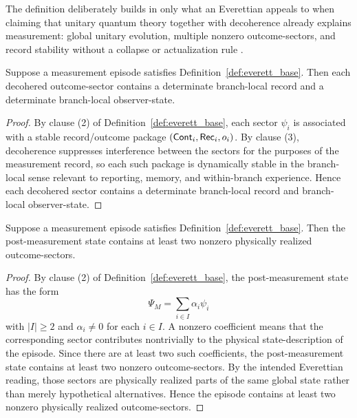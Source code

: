 The definition deliberately builds in only what an Everettian appeals to when claiming that unitary
quantum theory together with decoherence already explains measurement: global unitary evolution,
multiple nonzero outcome-sectors, and record stability without a collapse or actualization rule
\citep{everett1957,zurek2003,wallace2012}.

\begin{lemma}
\label{lem:branch-local-determinacy}
Suppose a measurement episode satisfies Definition~\ref{def:everett_base}. Then each decohered
outcome-sector contains a determinate branch-local record and a determinate branch-local
observer-state.
\end{lemma}

\begin{proof}
By clause (2) of Definition~\ref{def:everett_base}, each sector $\psi_i$ is associated with a stable
record/outcome package $(\mathsf{Cont}_i,\mathsf{Rec}_i,o_i)$. By clause (3), decoherence suppresses interference
between the sectors for the purposes of the measurement record, so each such package is dynamically
stable in the branch-local sense relevant to reporting, memory, and within-branch experience. Hence
each decohered sector contains a determinate branch-local record and branch-local observer-state.
\end{proof}

\begin{lemma}
\label{lem:unitary_multiplicity}
Suppose a measurement episode satisfies Definition~\ref{def:everett_base}. Then the post-measurement
state contains at least two nonzero physically realized outcome-sectors.
\end{lemma}

\begin{proof}
By clause (2) of Definition~\ref{def:everett_base}, the post-measurement state has the form
\[
\Psi_M=\sum_{i\in I}\alpha_i\psi_i
\]
with $|I|\ge 2$ and $\alpha_i\neq 0$ for each $i\in I$. A nonzero coefficient means that the
corresponding sector contributes nontrivially to the physical state-description of the episode. Since
there are at least two such coefficients, the post-measurement state contains at least two nonzero
outcome-sectors. By the intended Everettian reading, those sectors are physically realized parts of the
same global state rather than merely hypothetical alternatives. Hence the episode contains at least two
nonzero physically realized outcome-sectors.
\end{proof}

